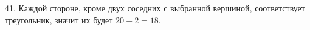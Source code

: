 41. Каждой стороне, кроме двух соседних с выбранной вершиной, соответствует треугольник, значит их будет $20-2=18.$\\
